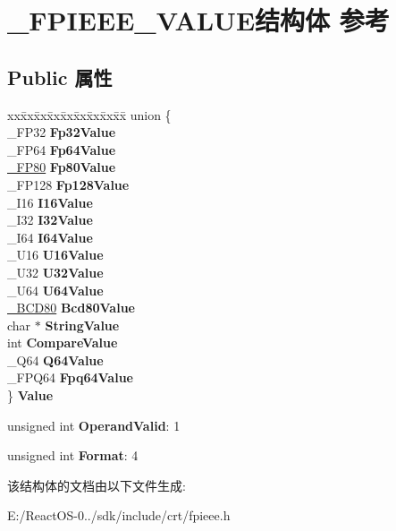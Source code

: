 \hypertarget{struct___f_p_i_e_e_e___v_a_l_u_e}{}\section{\+\_\+\+F\+P\+I\+E\+E\+E\+\_\+\+V\+A\+L\+U\+E结构体 参考}
\label{struct___f_p_i_e_e_e___v_a_l_u_e}
\subsection*{Public 属性}
\begin{DoxyCompactItemize}
\item 
\mbox{\label{struct___f_p_i_e_e_e___v_a_l_u_e_a3732543c34fa8eccc3fbd1d62f5c2fc6}} 
\begin{tabbing}
xx\=xx\=xx\=xx\=xx\=xx\=xx\=xx\=xx\=\kill
union \{\\
\>\_FP32 {\bfseries Fp32Value}\\
\>\_FP64 {\bfseries Fp64Value}\\
\>\hyperlink{struct___f_p80}{\_FP80} {\bfseries Fp80Value}\\
\>\_FP128 {\bfseries Fp128Value}\\
\>\_I16 {\bfseries I16Value}\\
\>\_I32 {\bfseries I32Value}\\
\>\_I64 {\bfseries I64Value}\\
\>\_U16 {\bfseries U16Value}\\
\>\_U32 {\bfseries U32Value}\\
\>\_U64 {\bfseries U64Value}\\
\>\hyperlink{struct___b_c_d80}{\_BCD80} {\bfseries Bcd80Value}\\
\>char $\ast$ {\bfseries StringValue}\\
\>int {\bfseries CompareValue}\\
\>\_Q64 {\bfseries Q64Value}\\
\>\_FPQ64 {\bfseries Fpq64Value}\\
\} {\bfseries Value}\\

\end{tabbing}\item 
\mbox{\label{struct___f_p_i_e_e_e___v_a_l_u_e_af47fb934bcac84d63ad3ae28fbeabe13}} 
unsigned int {\bfseries Operand\+Valid}\+: 1
\item 
\mbox{\label{struct___f_p_i_e_e_e___v_a_l_u_e_a973c1c4b7635832e255d28172330f43e}} 
unsigned int {\bfseries Format}\+: 4
\end{DoxyCompactItemize}


该结构体的文档由以下文件生成\+:\begin{DoxyCompactItemize}
\item 
E\+:/\+React\+O\+S-\/0../sdk/include/crt/fpieee.\+h\end{DoxyCompactItemize}
